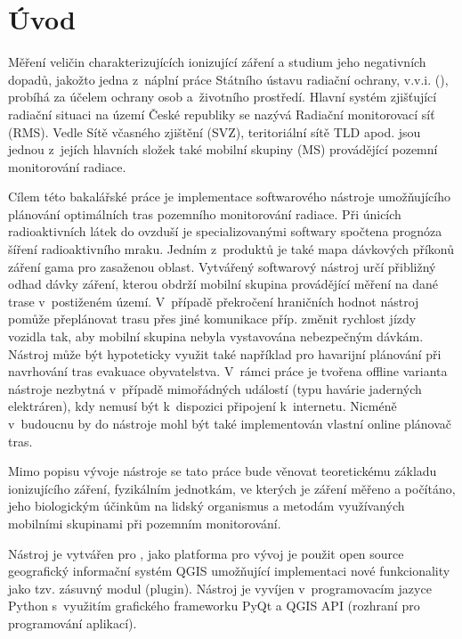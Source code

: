 \chapter{Úvod}
\label{1-uvod} Měření veličin charakterizujících ionizující záření a
studium jeho negativních dopadů, jakožto jedna z~náplní práce Státního
ústavu radiační ochrany, v.v.i. (), probíhá za účelem ochrany
osob a~životního prostředí.  Hlavní systém zjišťující radiační situaci
na území České republiky se nazývá Radiační monitorovací síť
(RMS). Vedle Sítě včasného zjištění (SVZ), teritoriální sítě TLD
apod. jsou jednou z~jejích hlavních složek také mobilní skupiny (MS)
provádějící pozemní monitorování radiace. \cite{suroRMS}

Cílem této bakalářské práce je implementace softwarového nástroje
umožňujícího plánování optimálních tras pozemního monitorování
radiace. Při únicích radioaktivních látek do ovzduší je
specializovanými softwary spočtena prognóza šíření radioaktivního
mraku. Jedním z~produktů je také mapa dávkových příkonů záření gama
pro zasaženou oblast. Vytvářený softwarový nástroj určí přibližný
odhad dávky záření, kterou obdrží mobilní skupina provádějící měření
na dané trase v~postiženém území. V~případě překročení hraničních
hodnot nástroj pomůže přeplánovat trasu přes jiné komunikace
příp. změnit rychlost jízdy vozidla tak, aby mobilní skupina nebyla
vystavována nebezpečným dávkám.  Nástroj může být hypoteticky využit
také například pro havarijní plánování při navrhování tras evakuace
obyvatelstva. V~rámci práce je tvořena offline varianta nástroje
nezbytná v~případě mimořádných událostí (typu havárie jaderných
elektráren), kdy nemusí být k~dispozici připojení k~internetu. Nicméně
v~budoucnu by do nástroje mohl být také implementován vlastní online
plánovač tras.

Mimo popisu vývoje nástroje se tato práce bude věnovat teoretickému
základu ionizujícího záření, fyzikálním jednotkám, ve kterých je
záření měřeno a počítáno, jeho biologickým účinkům na lidský
organismus a metodám využívaných mobilními skupinami při pozemním
monitorování.

Nástroj je vytvářen pro , jako platforma pro vývoj je použit
open source geo\-grafický informační systém QGIS umožňující implementaci
nové funkcionality jako tzv. zásuvný modul (plugin). Nástroj je
vyvíjen v~programovacím jazyce Python s~využitím grafického frameworku
PyQt a QGIS API (rozhraní pro programování aplikací).
